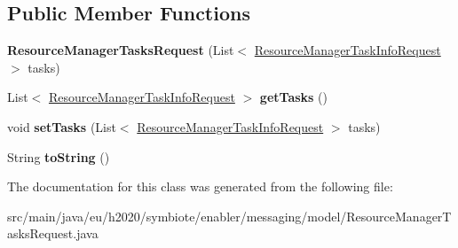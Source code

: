 \subsection*{Public Member Functions}
\begin{DoxyCompactItemize}
\item 
\mbox{\label{classeu_1_1h2020_1_1symbiote_1_1enabler_1_1messaging_1_1model_1_1ResourceManagerTasksRequest_a800e6716a0048cae359923c67cb8a027}} 
{\bfseries Resource\+Manager\+Tasks\+Request} (List$<$ \hyperlink{classeu_1_1h2020_1_1symbiote_1_1enabler_1_1messaging_1_1model_1_1ResourceManagerTaskInfoRequest}{Resource\+Manager\+Task\+Info\+Request} $>$ tasks)
\item 
\mbox{\label{classeu_1_1h2020_1_1symbiote_1_1enabler_1_1messaging_1_1model_1_1ResourceManagerTasksRequest_ad1d9d208b1a1c6642755f5d5b886d9d4}} 
List$<$ \hyperlink{classeu_1_1h2020_1_1symbiote_1_1enabler_1_1messaging_1_1model_1_1ResourceManagerTaskInfoRequest}{Resource\+Manager\+Task\+Info\+Request} $>$ {\bfseries get\+Tasks} ()
\item 
\mbox{\label{classeu_1_1h2020_1_1symbiote_1_1enabler_1_1messaging_1_1model_1_1ResourceManagerTasksRequest_abcae65cee72f593ee3c20a051d69430c}} 
void {\bfseries set\+Tasks} (List$<$ \hyperlink{classeu_1_1h2020_1_1symbiote_1_1enabler_1_1messaging_1_1model_1_1ResourceManagerTaskInfoRequest}{Resource\+Manager\+Task\+Info\+Request} $>$ tasks)
\item 
\mbox{\label{classeu_1_1h2020_1_1symbiote_1_1enabler_1_1messaging_1_1model_1_1ResourceManagerTasksRequest_a0541bc10443e184f2a0acba712ad9901}} 
String {\bfseries to\+String} ()
\end{DoxyCompactItemize}


The documentation for this class was generated from the following file\+:\begin{DoxyCompactItemize}
\item 
src/main/java/eu/h2020/symbiote/enabler/messaging/model/Resource\+Manager\+Tasks\+Request.\+java\end{DoxyCompactItemize}
